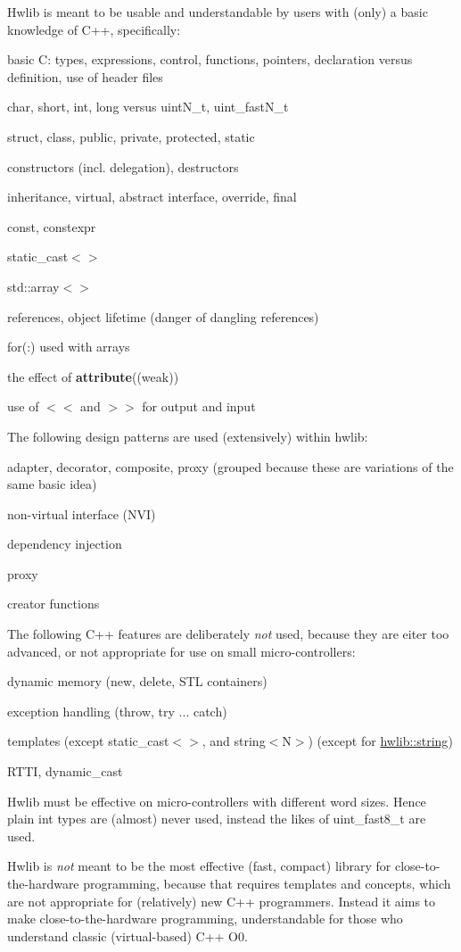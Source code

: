 Hwlib is meant to be usable and understandable by users with (only) a basic knowledge of C++, specifically\+:
\begin{DoxyItemize}
\item basic C\+: types, expressions, control, functions, pointers, declaration versus definition, use of header files
\item char, short, int, long versus uint\+N\+\_\+t, uint\+\_\+fast\+N\+\_\+t
\item struct, class, public, private, protected, static
\item constructors (incl. delegation), destructors
\item inheritance, virtual, abstract interface, override, final
\item const, constexpr
\item static\+\_\+cast$<$$>$
\item std\+::array$<$$>$
\item references, object lifetime (danger of dangling references)
\item for(\+:) used with arrays
\item the effect of {\bfseries attribute}((weak))
\item use of $<$$<$ and $>$$>$ for output and input
\end{DoxyItemize}

The following design patterns are used (extensively) within hwlib\+:
\begin{DoxyItemize}
\item adapter, decorator, composite, proxy (grouped because these are variations of the same basic idea)
\item non-\/virtual interface (N\+VI)
\item dependency injection
\item proxy
\item creator functions
\end{DoxyItemize}

The following C++ features are deliberately {\itshape not} used, because they are eiter too advanced, or not appropriate for use on small micro-\/controllers\+:
\begin{DoxyItemize}
\item dynamic memory (new, delete, S\+TL containers)
\item exception handling (throw, try ... catch)
\item templates (except static\+\_\+cast$<$$>$, and string$<$\+N$>$) (except for \hyperlink{classhwlib_1_1string}{hwlib\+::string})
\item R\+T\+TI, dynamic\+\_\+cast
\end{DoxyItemize}

Hwlib must be effective on micro-\/controllers with different word sizes. Hence plain int types are (almost) never used, instead the likes of uint\+\_\+fast8\+\_\+t are used.

Hwlib is {\itshape not} meant to be the most effective (fast, compact) library for close-\/to-\/the-\/hardware programming, because that requires templates and concepts, which are not appropriate for (relatively) new C++ programmers. Instead it aims to make close-\/to-\/the-\/hardware programming, understandable for those who understand classic (virtual-\/based) C++ O0. 